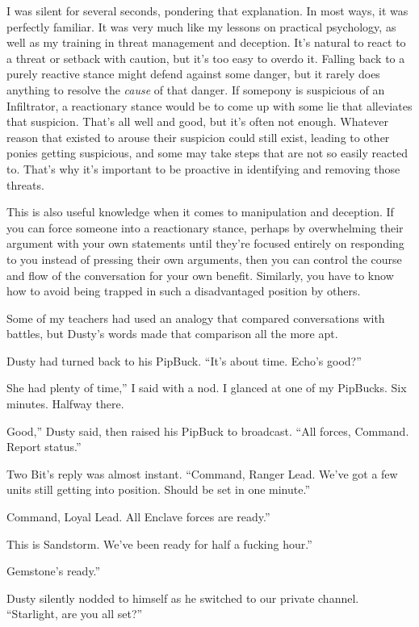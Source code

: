 I was silent for several seconds, pondering that explanation. In most ways, it was perfectly familiar. It was very much like my lessons on practical psychology, as well as my training in threat management and deception. It’s natural to react to a threat or setback with caution, but it’s too easy to overdo it. Falling back to a purely reactive stance might defend against some danger, but it rarely does anything to resolve the \textit{cause} of that danger. If somepony is suspicious of an Infiltrator, a reactionary stance would be to come up with some lie that alleviates that suspicion. That’s all well and good, but it’s often not enough. Whatever reason that existed to arouse their suspicion could still exist, leading to other ponies getting suspicious, and some may take steps that are not so easily reacted to. That’s why it’s important to be proactive in identifying and removing those threats.

This is also useful knowledge when it comes to manipulation and deception. If you can force someone into a reactionary stance, perhaps by overwhelming their argument with your own statements until they’re focused entirely on responding to you instead of pressing their own arguments, then you can control the course and flow of the conversation for your own benefit. Similarly, you have to know how to avoid being trapped in such a disadvantaged position by others.

Some of my teachers had used an analogy that compared conversations with battles, but Dusty’s words made that comparison all the more apt.

Dusty had turned back to his PipBuck. “It’s about time. Echo’s good?”

\leavevmode{}She had plenty of time,” I said with a nod. I glanced at one of my PipBucks. Six minutes. Halfway there.

\leavevmode{}Good,” Dusty said, then raised his PipBuck to broadcast. “All forces, Command. Report status.”

Two Bit’s reply was almost instant. “Command, Ranger Lead. We’ve got a few units still getting into position. Should be set in one minute.”

\leavevmode{}Command, Loyal Lead. All Enclave forces are ready.”

\leavevmode{}This is Sandstorm. We’ve been ready for half a fucking hour.”

\leavevmode{}Gemstone’s ready.”

Dusty silently nodded to himself as he switched to our private channel. “Starlight, are you all set?”

